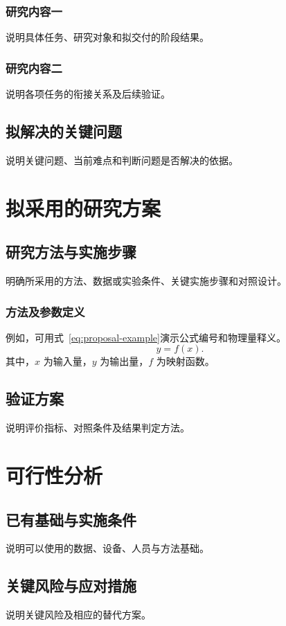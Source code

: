 \subsection{研究内容一}
说明具体任务、研究对象和拟交付的阶段结果。

\subsection{研究内容二}
说明各项任务的衔接关系及后续验证。

\section{拟解决的关键问题}
说明关键问题、当前难点和判断问题是否解决的依据。

\chapter{拟采用的研究方案}

\section{研究方法与实施步骤}
明确所采用的方法、数据或实验条件、关键实施步骤和对照设计。

\subsection{方法及参数定义}
例如，可用式~\eqref{eq:proposal-example}演示公式编号和物理量释义。
\begin{equation}
  y = f(x).
  \label{eq:proposal-example}
\end{equation}
\noindent 其中，$x$ 为输入量，$y$ 为输出量，$f$ 为映射函数。

\section{验证方案}
说明评价指标、对照条件及结果判定方法。

\chapter{可行性分析}

\section{已有基础与实施条件}
说明可以使用的数据、设备、人员与方法基础。

\section{关键风险与应对措施}
说明关键风险及相应的替代方案。

